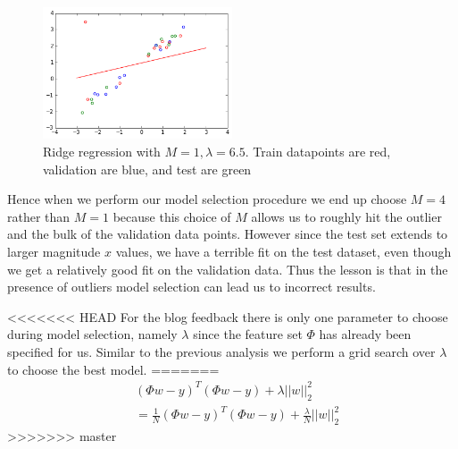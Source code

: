 \documentclass{article}
\begin{document}
\begin{figure}[h]
\centering
\includegraphics[width=0.5\textwidth]{m-1-model-selection}
\caption{Ridge regression with $M = 1, \lambda = 6.5$. Train datapoints are red, validation are blue, and test are green}
\label{m-1-model-selection}
\end{figure}
%
%
%
Hence when we perform our model selection procedure we end up choose $M = 4$ rather than $M = 1$ because this choice of $M$ allows us to roughly hit the outlier and the bulk of the validation data points. However since the test set extends to larger magnitude $x$ values, we have a terrible fit on the test dataset, even though we get a relatively good fit on the validation data. Thus the lesson is that in the presence of outliers model selection can lead us to incorrect results.
%
%

<<<<<<< HEAD
For the blog feedback there is only one parameter to choose during model selection, namely $\lambda$ since the feature set $\Phi$ has already been specified for us. Similar to the previous analysis we perform a grid search over $\lambda$ to choose the best model.
=======
\begin{align*}
&(\Phi w - y)^T(\Phi w - y) + \lambda ||w||_2^2\\
& = \frac{1}{N}(\Phi w - y)^T(\Phi w - y) + \frac{\lambda}{N} ||w||_2^2
\end{align*}
>>>>>>> master


\end{document}
